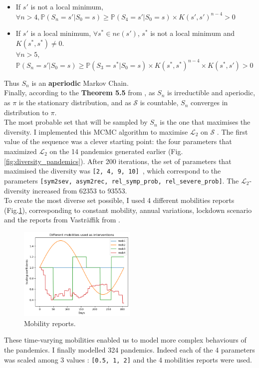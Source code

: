 \begin{itemize}
    \item If $s'$ is not a local minimum, \\
     $\forall n >4, \mathbb{P}(S_{n} = s' \vert S_0 = s) \geqslant \mathbb{P}(S_{4} = s' \vert S_0 = s) \times K(s', s')^{n-4} > 0 $ \\
    \item If $s'$ is a local minimum,  $\forall s^* \in ne(s')$, $s^*$ is not a local minimum and $K(s^*, s^*) \neq 0$. \\
    $\forall n>5$, $\mathbb{P}(S_n = s' \vert S_0 = s )   \geqslant \mathbb{P}(S_3=s^* \vert S_0 = s ) \times K(s^*, s^*)^{n-4} \times K(s^*, s') >0 $\\
    
\end{itemize}

Thus $S_n$ is an \textbf{aperiodic} Markov Chain.\\


Finally, according to the \textbf{Theorem 5.5 } from \cite*{bodineau2015modelisation}, as $S_n$ is irreductible and aperiodic, as $\pi$ is the stationary distribution, and as $\mathcal{S}$ is countable, $S_n$ converges in distribution to $\pi$.\\


The most probable set that will be sampled by $S_n$ is the one that maximises the diversity.
I implemented this MCMC algorithm to maximise $\mathcal{L}_2$ on $\mathcal{S}$ . 
The first value of the sequence was a clever starting point: the four parameters that maximized $\mathcal{L}_2$ on the 14 pandemics generated earlier (Fig.\ref{fig:diversity_pandemics}).  
After 200 iterations, the set of parameters that maximised the diversity was \texttt{[2, 4, 9, 10] }, which correspond to the parameters \texttt{[sym2sev, asym2rec, rel\_symp\_prob, rel\_severe\_prob]}. 
The $\mathcal{L}_2$- diversity increased from 62353 to 93553. \\

To create the most diverse set possible, I used 4 different mobilities reports (Fig.\ref{fig:mobilities}), corresponding to constant mobility, annual variations, lockdown scenario and the reports from Vasträffik from \cite{gerlee2021predicting}. 
\begin{figure}
    \centering
    \includegraphics[width=0.5\textwidth]{figures/mobilities.png}
    \caption{Mobility reports.}
    \label{fig:mobilities}
\end{figure}
These time-varying mobilities enabled us to model more complex behaviours of the pandemics. 
I finally modelled 324 pandemics. 
Indeed each of the 4 parameters was scaled among 3 values : \texttt{[0.5, 1, 2]} and the 4 mobilities reports were used.

